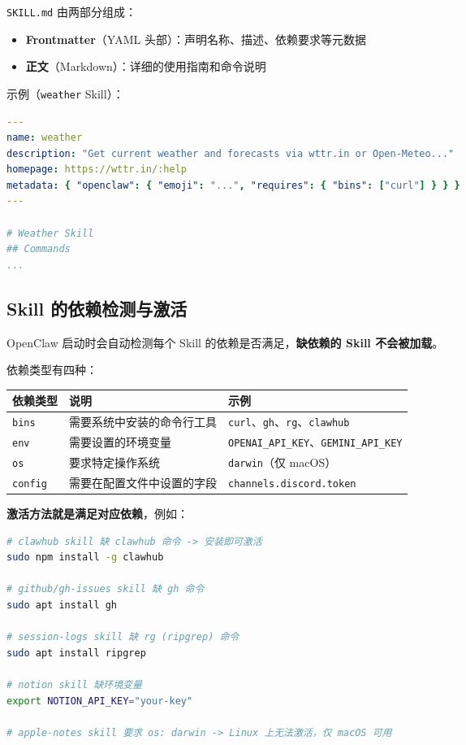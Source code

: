 \texttt{SKILL.md} 由两部分组成：

\begin{itemize}
  \item \textbf{Frontmatter}（YAML 头部）：声明名称、描述、依赖要求等元数据
  \item \textbf{正文}（Markdown）：详细的使用指南和命令说明
\end{itemize}

示例（\texttt{weather} Skill）：

\begin{lstlisting}[language=yaml]
---
name: weather
description: "Get current weather and forecasts via wttr.in or Open-Meteo..."
homepage: https://wttr.in/:help
metadata: { "openclaw": { "emoji": "...", "requires": { "bins": ["curl"] } } }
---

# Weather Skill
## Commands
...
\end{lstlisting}

\subsection{Skill 的依赖检测与激活}


OpenClaw 启动时会自动检测每个 Skill 的依赖是否满足，\textbf{缺依赖的 Skill 不会被加载}。

依赖类型有四种：

\begin{table}[h]
\centering
\small
\begin{tabular}{|l|l|l|}
\hline
依赖类型 & 说明 & 示例 \\
\hline
\texttt{bins} & 需要系统中安装的命令行工具 & \texttt{curl}、\texttt{gh}、\texttt{rg}、\texttt{clawhub} \\
\hline
\texttt{env} & 需要设置的环境变量 & \texttt{OPENAI\_API\_KEY}、\texttt{GEMINI\_API\_KEY} \\
\hline
\texttt{os} & 要求特定操作系统 & \texttt{darwin}（仅 macOS） \\
\hline
\texttt{config} & 需要在配置文件中设置的字段 & \texttt{channels.discord.token} \\
\hline
\end{tabular}
\end{table}

\textbf{激活方法就是满足对应依赖}，例如：

\begin{lstlisting}[language=bash]
# clawhub skill 缺 clawhub 命令 -> 安装即可激活
sudo npm install -g clawhub

# github/gh-issues skill 缺 gh 命令
sudo apt install gh

# session-logs skill 缺 rg (ripgrep) 命令
sudo apt install ripgrep

# notion skill 缺环境变量
export NOTION_API_KEY="your-key"

# apple-notes skill 要求 os: darwin -> Linux 上无法激活，仅 macOS 可用
\end{lstlisting}

